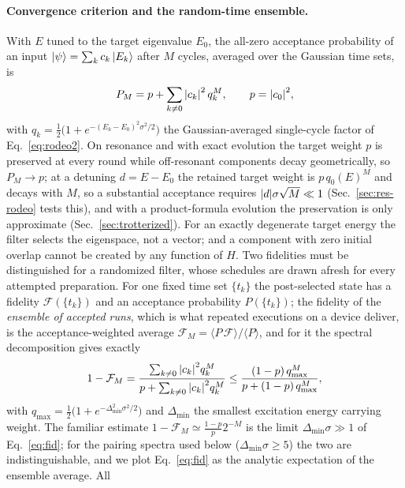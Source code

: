 \documentclass[
  aps,            %
  prc,            %
  reprint,        %
  superscriptaddress,
  floatfix,
  nofootinbib
]{revtex4-2}
\begin{document}
\paragraph{Convergence criterion and the random-time ensemble.}
With $E$ tuned to the target eigenvalue $E_0$, the all-zero acceptance probability of
an input $\ket{\psi}=\sum_k c_k\ket{E_k}$ after $M$ cycles, averaged over the
Gaussian time sets, is
\begin{equation}
  P_M=p+\sum_{k\neq0}\abs{c_k}^2\,q_k^{M},
  \qquad p=\abs{c_0}^2 ,
  \label{eq:PM}
\end{equation}
with $q_k=\tfrac12\big(1+e^{-(E_k-E_0)^2\sigma^2/2}\big)$ the Gaussian-averaged
single-cycle factor of Eq.~\eqref{eq:rodeo2}.
On resonance and with exact evolution the target weight $p$ is preserved at
every round while off-resonant components decay geometrically, so
$P_M\to p$; at a detuning $d=E-E_0$ the retained target weight is
$p\,q_0(E)^M$ and decays with $M$, so a substantial acceptance requires
$\abs{d}\sigma\sqrt M\ll1$ (Sec.~\ref{sec:res-rodeo} tests this), and with a
product-formula evolution the preservation is only approximate
(Sec.~\ref{sec:trotterized}).  For an exactly degenerate target energy the
filter selects the eigenspace, not a vector; and a component with zero
initial overlap cannot be created by any function of $H$.  Two fidelities
must be distinguished for a randomized filter, whose schedules are drawn
afresh for every attempted preparation.  For one fixed time set $\{t_k\}$ the post-selected state has
a fidelity $\mathcal F(\{t_k\})$ and an acceptance probability $P(\{t_k\})$; the
fidelity of the \emph{ensemble of accepted runs}, which is what repeated
executions on a device deliver, is the acceptance-weighted average
$\mathcal F_M=\langle P\,\mathcal F\rangle/\langle P\rangle$, and for it the
spectral decomposition gives exactly
\begin{equation}
  1-\mathcal{F}_M=\frac{\sum_{k\neq0}\abs{c_k}^2 q_k^{M}}
                       {p+\sum_{k\neq0}\abs{c_k}^2 q_k^{M}}
  \le\frac{(1-p)\,q_{\max}^{M}}{p+(1-p)\,q_{\max}^{M}},
  \label{eq:fid}
\end{equation}
with $q_{\max}=\tfrac12\big(1+e^{-\Delta_{\min}^2\sigma^2/2}\big)$ and
$\Delta_{\min}$ the smallest excitation energy carrying weight.  The
familiar estimate $1-\mathcal F_M\simeq\tfrac{1-p}{p}2^{-M}$ is the limit
$\Delta_{\min}\sigma\gg1$ of Eq.~\eqref{eq:fid}; for the pairing spectra used
below ($\Delta_{\min}\sigma\ge5$) the two are indistinguishable, and we plot
Eq.~\eqref{eq:fid} as the analytic expectation of the ensemble average.  All
\end{document}
